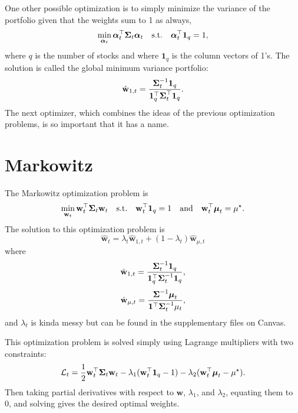 One other possible optimization is to simply minimize the variance of the portfolio given that the weights sum to 1 as always, $$ \min_{\boldsymbol{\alpha}_t}\boldsymbol{\alpha}_t^\top\boldsymbol{\Sigma}_t\boldsymbol{\alpha}_t\quad\text{s.t.}\quad\boldsymbol{\alpha}_t^\top\mathbf 1_q=1, $$ where $q$ is the number of stocks and where $\mathbf 1_q$ is the column vectors of 1's. The solution is called the global minimum variance portfolio: $$ \hat{\mathbf w}_{1,t} = \frac{\boldsymbol{\Sigma}_t^{-1}\mathbf 1_q}{\mathbf 1_q^\top\boldsymbol{\Sigma}_t^\top\mathbf 1_q}. $$ The next optimizer, which combines the ideas of the previous optimization problems, is so important that it has a name.

\section{Markowitz}
The Markowitz optimization problem is $$ \min_{\mathbf w_t}\mathbf w_t^\top\boldsymbol{\Sigma}_t\mathbf w_t\quad\text{s.t.}\quad\mathbf w_t^\top\mathbf 1_q=1\quad\text{and}\quad\mathbf w_t^\top \boldsymbol{\mu}_t=\mu^\star. $$ The solution to this optimization problem is $$ \hat{\mathbf w}_t = \lambda_t\hat{\mathbf w}_{1,t} + (1-\lambda_t)\hat{\mathbf w}_{\mu,t} $$ where $$ \hat{\mathbf w}_{1,t} = \frac{\boldsymbol{\Sigma}_t^{-1}\mathbf 1_q}{\mathbf 1_q^\top\mathbf\Sigma_t^{-1}\mathbf 1_q}, $$ $$ \hat{\mathbf w}_{\mu,t} = \frac{\boldsymbol{\Sigma}^{-1}\boldsymbol{\mu}_t}{\mathbf 1^\top\boldsymbol{\Sigma}_t^{-1}\mathbf\mu_t}, $$ and $\lambda_t$ is kinda messy but can be found in the supplementary files on Canvas.


This optimization problem is solved simply using Lagrange multipliers with two constraints: $$ \mathcal L_t = \frac{1}{2}\mathbf w_t^\top\boldsymbol{\Sigma}_t\mathbf w_t - \lambda_1(\mathbf w_t^\top\mathbf 1_q-1) - \lambda_2(\mathbf w_t^\top\boldsymbol{\mu}_t-\mu^\star). $$ Then taking partial derivatives with respect to $\mathbf w$, $\lambda_1$, and $\lambda_2$, equating them to 0, and solving gives the desired optimal weights.


